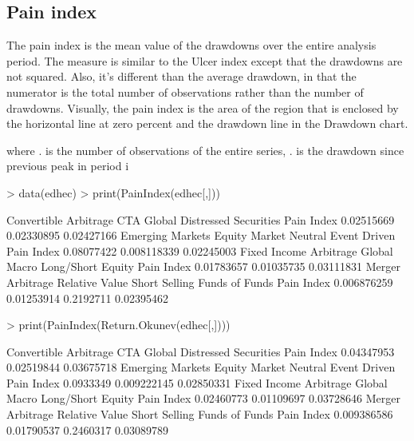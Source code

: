 \documentclass[12pt,letterpaper,english]{article}
\begin{document}
\subsection{Pain index}

The pain index is the mean value of the drawdowns over the entire analysis period. The measure is similar to the Ulcer index except that the drawdowns are not squared.  Also, it's different than the average drawdown, in that the numerator is the total number of observations rather than the number of drawdowns. Visually, the pain index is the area of the region that is enclosed by the horizontal line at zero percent and the drawdown line in the Drawdown chart.


where . is the number of observations of the entire series, . is the drawdown since previous peak in period i

\begin{Schunk}
\begin{Sinput}
> data(edhec)
> print(PainIndex(edhec[,]))
\end{Sinput}
\begin{Soutput}
           Convertible Arbitrage CTA Global Distressed Securities
Pain Index            0.02515669 0.02330895            0.02427166
           Emerging Markets Equity Market Neutral Event Driven
Pain Index       0.08077422           0.008118339   0.02245003
           Fixed Income Arbitrage Global Macro Long/Short Equity
Pain Index             0.01783657   0.01035735        0.03111831
           Merger Arbitrage Relative Value Short Selling Funds of Funds
Pain Index      0.006876259     0.01253914     0.2192711     0.02395462
\end{Soutput}
\begin{Sinput}
> print(PainIndex(Return.Okunev(edhec[,])))
\end{Sinput}
\begin{Soutput}
           Convertible Arbitrage CTA Global Distressed Securities
Pain Index            0.04347953 0.02519844            0.03675718
           Emerging Markets Equity Market Neutral Event Driven
Pain Index        0.0933349           0.009222145   0.02850331
           Fixed Income Arbitrage Global Macro Long/Short Equity
Pain Index             0.02460773   0.01109697        0.03728646
           Merger Arbitrage Relative Value Short Selling Funds of Funds
Pain Index      0.009386586     0.01790537     0.2460317     0.03089789
\end{Soutput}
\end{Schunk}
\end{document}
